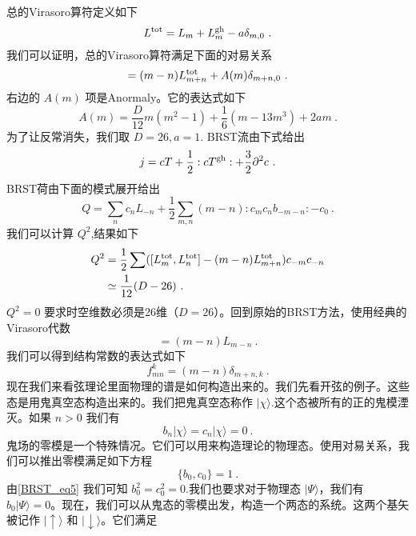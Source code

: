 总的Virasoro算符定义如下
\begin{equation}
L^{\rm tot} = L_m + L^{\rm gh}_m - a \delta_{m,0}~.
\end{equation}
我们可以证明，总的Virasoro算符满足下面的对易关系
\begin{equation}
[L^{\rm tot}_m,L^{\rm tot}_n] = (m-n) L^{\rm tot}_{m+n} + A(m) \delta_{m+n,0}~. 
\end{equation}
右边的 $A(m)$ 项是Anormaly。它的表达式如下
\begin{equation}
A(m) = \frac{D}{12} m (m^2-1) + \frac{1}{6} (m-13 m^3) + 2 a m~. 
\end{equation}
为了让反常消失，我们取 $D=26,a=1$. BRST流由下式给出
\begin{equation}
j = c T+ \frac{1}{2} : c T^{\rm gh} : + \frac{3}{2} \partial^2 c~.
\end{equation}
BRST荷由下面的模式展开给出
\begin{equation}
Q = \sum_n c_n L_{-n} + \frac{1}{2} \sum_{m,n} (m-n) :c_m c_n b_{-m-n}: -c_0~.
\end{equation}
我们可以计算 $Q^2$,结果如下
\begin{equation}
\begin{aligned}
Q^2&  = \frac{1}{2} \sum ( [L^{\rm tot}_m,L^{\rm tot}_n] - (m-n) L^{\rm tot}_{m+n} ) c_{-m} c_{-n} \\
& \simeq \frac{1}{12} (D-26)~.
\end{aligned}
\end{equation}
$Q^2=0$ 要求时空维数必须是26维（$D=26$）。回到原始的BRST方法，使用经典的Virasoro代数
\begin{equation}
[L_m,L_n]=(m-n)L_{m-n}~.
\end{equation}
我们可以得到结构常数的表达式如下
\begin{equation}
f^k_{mn} = (m-n) \delta_{m+n,k}~.
\end{equation}
现在我们来看弦理论里面物理的谱是如何构造出来的。我们先看开弦的例子。这些态是用鬼真空态构造出来的。我们把鬼真空态称作 $|\chi\rangle$.这个态被所有的正的鬼模湮灭。如果 $n>0$ 我们有
\begin{equation}
b_n|\chi\rangle = c_n|\chi\rangle = 0~.
\end{equation}
鬼场的零模是一个特殊情况。它们可以用来构造理论的物理态。使用对易关系，我们可以推出零模满足如下方程
\begin{equation}
\{b_0,c_0\} = 1~.
\end{equation}
由\autoref{BRST_eq5} 我们可知 $b_0^2=c_0^2=0$.我们也要求对于物理态 $|\Psi\rangle$，我们有 $b_0|\Psi\rangle = 0$。现在，我们可以从鬼态的零模出发，构造一个两态的系统。这两个基矢被记作 $|\uparrow\rangle$ 和 $|\downarrow\rangle$。它们满足
